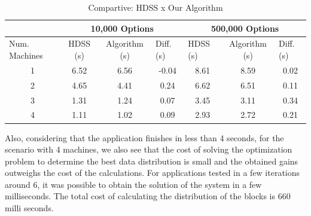 \documentclass[journal]{IEEEtran}
\begin{document}
\begin{table}[htb]
\centering
\tiny
\caption{Compartive: HDSS x Our Algorithm}

\begin{tabular}{c|c|c|c|c|c|c|}
\cline{2-7}
\multicolumn{1}{l|}{}                 & \multicolumn{3}{c|}{10,000 Options}                              & \multicolumn{3}{c|}{500,000 Options}                                                  \\ \hline
\multicolumn{1}{|l|}{Num. Machines} & HDSS (s) & Algorithm (s) & \multicolumn{1}{l|}{Diff. (s)} & \multicolumn{1}{l|}{HDSS (s)} & Algorithm (s) & \multicolumn{1}{l|}{Diff. (s)} \\ \hline
\multicolumn{1}{|c|}{1 }       & 6.52     & 6.56              & -0.04                          
			 & 8.61                          & 8.59              & 0.02                           \\ \hline
\multicolumn{1}{|c|}{2 }      & 4.65     & 4.41              & 0.24                            
				& 6.62                          & 6.51              & 0.11                            \\ \hline
\multicolumn{1}{|c|}{3 }      & 1.31     & 1.24              & 0.07                            
			& 3.45                          & 3.11              &               0.34                  \\ \hline
\multicolumn{1}{|c|}{4 }      & 1.11     & 1.02              & 0.09                       
			    & 2.93                          & 2.72              &               0.21                  \\ \hline
\end{tabular}
\label{table: black}
\end{table}

Also, considering that the application finishes in less than 4 seconds, for the
scenario with 4 machines, we also see that the cost of solving the optimization
problem to determine the best data distribution is small and the obtained gains
outweighs the cost of the calculations. For applications tested in a few
iterations around 6, it was possible to obtain the solution of the system in a
few milliseconds. The total cost of calculating the distribution of the blocks is 660 
milli seconds.
\end{document}
